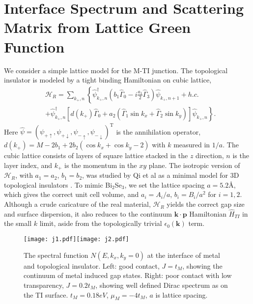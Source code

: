 \documentclass[11pt]{report}
\def\v#1{\mathbf{#1}}
\newcommand{\kp}{k_{+}}
\begin{document}
\section{Interface Spectrum and Scattering Matrix from Lattice Green Function} 

We consider a simple lattice model for the M-TI junction.
The topological insulator is modeled by 
a tight binding Hamiltonian on cubic lattice,
\begin{align*}
&\mathscr{H}_R=\sum_{\kp,n}\left\{ 
\hat{\psi}_{\kp,n}^\dagger (b_1\hat{\Gamma}_0-i\frac{a_1}{2}\hat{\Gamma}_3)  \hat{\psi}_{\kp,n+1}+ h.c. \right. \\
&+\left. 
\hat{\psi}_{\kp,n}^\dagger\left[d(\kp)\hat{\Gamma}_0+a_2(\hat{\Gamma}_1\sin k_x +\hat{\Gamma}_2\sin k_y)\right] \hat{\psi}_{\kp,n} \right\} .
\end{align*}
Here $\hat{\psi}=(\psi_{+\uparrow},\psi_{+\downarrow},\psi_{-\uparrow},\psi_{-\downarrow})^\mathrm{T}$ is the annihilation operator, $d(\kp)=M-2b_1+2b_2(\cos k_x+\cos k_y-2)$ with $k$ measured in $1/a$. 
The cubic lattice consists of layers of square lattice stacked in the $z$ direction,
$n$ is the layer index, and $\kp$ is the momentum in the $xy$ plane.
The isotropic version of $\mathscr{H}_R$, with $a_1=a_2$, $b_1=b_2$, was 
studied by Qi et al as a minimal model for 3D topological insulators \cite{qi_field}.
To mimic Bi$_2$Se$_3$, we set the lattice spacing $a=5.2$\AA, which gives the correct unit cell volume, 
and $a_i=A_i/a$, $b_i=B_i/a^2$ for $i=1,2$. Although a crude caricature 
of the real material, $\mathscr{H}_R$ yields the correct gap size and surface dispersion, it also reduces to 
the continuum  $\mathbf{k\cdot p}$ Hamiltonian $\hat{H}_{TI}$ in the small $k$ limit, 
aside from the topologically trivial $\epsilon_0(\v{k})$ term.
 
\begin{figure}
\texttt{[image: j1.pdf]}\texttt{[image: j2.pdf]}
\caption{The spectral function $N(E,k_x,k_y=0)$ at the interface of metal and topological insulator. Left: 
good contact, $J=t_M$, showing the continuum of metal induced gap states. 
Right: poor contact with low transparency, $J=0.2t_M$, showing well 
defined Dirac spectrum as on the TI surface. $t_M=0.18eV$, $\mu_M=-4t_M$, $a$ is lattice spacing.}
\end{figure}
 
\end{document}
